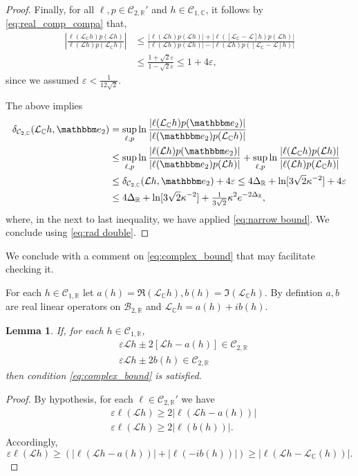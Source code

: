 \documentclass{amsart}
\numberwithin{equation}{section}
\newtheorem{lem}[thm]{Lemma}
\newcommand\cB{{\mathcal B}}
\newcommand\cC{{\mathcal C}}
\newcommand\cL{{\mathcal L}}
\newcommand\bC{{\mathbb C}}
\newcommand\bR{{\mathbb R}}
\newcommand\ve{\varepsilon}
\newcommand{\bbe}{\mathbbm e}
\begin{document}
\begin{proof}
Finally, for all $\ell,p\in\cC_{2,\bR}'$ and $h\in\cC_{1,\bC}$, it follows by \eqref{eq:real_comp_compa} that,
\[
\begin{split}
\left|\frac{\ell(\cL_{\bC}h)p(\cL h)}{\ell(\cL h)p( \cL_{\bC}h)}\right|&\leq 
\frac{|\ell(\cL h)p(\cL h)|+|\ell([\cL_{\bC}- \cL  ]h)p(\cL h)|}{|\ell(\cL h)p( \cL h)|
-|\ell(\cL h)p([\cL_{\bC}- \cL  ]h)|}\\
&\leq \frac{1+  \sqrt 2\ve}{1- \sqrt 2\ve}  \leq 1 + 4 \ve, 
\end{split}
\]
since we assumed $\ve < \frac 1{ 12 \sqrt{2}}$.


The above implies 
\begin{equation}
\label{eq:needed later}
\begin{split}
\delta_{\cC_{2, \bC}}(\cL_{\bC}h,\bbe_2)&=\sup_{\ell,p}\ln \frac{|\ell(\cL_{\bC}h)p(\bbe_2)|}{|\ell(\bbe_2)p( \cL_{\bC}h)|} \\
&\leq \sup_{\ell,p}\ln \frac{|\ell(\cL h)p(\bbe_2)|}{|\ell(\bbe_2)p( \cL h)|}+\sup_{\ell,p}\ln \frac{|\ell(\cL_{\bC}h)p(\cL h)|}{|\ell(\cL h)p( \cL_{\bC}h)|}\\
&\leq \delta_{\cC_{2, \bC} }(\cL h,\bbe_2)+ 4 \ve
\leq 4\Delta_\bR +  \ln[3 \sqrt 2\kappa^{-2}] + 4  \ve \\
&\leq 4\Delta_\bR +   \ln[3\sqrt 2\kappa^{-2}]+   \tfrac{1}{ 3 \sqrt{2} }  \kappa^2e^{-2\Delta_\bR},
\end{split}
\end{equation}
where, in the next to last inequality, we have applied \eqref{eq:narrow bound}. We conclude using
\eqref{eq:rad double}.
\end{proof}
We conclude with a comment on  \eqref{eq:complex_bound} that may facilitate checking it. 

For each $h\in\cC_{1,\bR}$ let $a(h)=\Re(\cL_{\bC} h), b(h)=\Im(\cL_{\bC} h)$. By defintion $a,b$ are real linear operators on $\cB_{2,\bR}$ and $\cL_{\bC} h =a(h)+i b(h)$. 

\begin{lem}\label{lem:pert_cond}
If, for each $h\in\cC_{1,\bR}$,
\[
\begin{split}
&\ve\cL h\pm2\left[\cL h- a(h)\right]\in\cC_{2,\bR}\\
&\ve\cL h \pm 2 b(h) \in\cC_{2,\bR}
\end{split}
\]
 then condition \eqref{eq:complex_bound} is satisfied.
\end{lem}
\begin{proof}
By hypothesis, for each $\ell\in\cC_{2,\bR}'$ we have
\[
\begin{split}
&\ve\ell(\cL h)\geq 2\left|\ell(\cL h- a(h))\right|\\
&\ve\ell(\cL h)\geq 2\left|\ell(b(h) )\right|.
\end{split}
\]
Accordingly,
\[
\ve\ell(\cL h)\geq\left(|\ell(\cL h- a(h))|+|\ell(- ib(h))|\right)\geq |\ell(\cL h- \cL_{\bC}(h))|.
\]
\end{proof}
\end{document}
